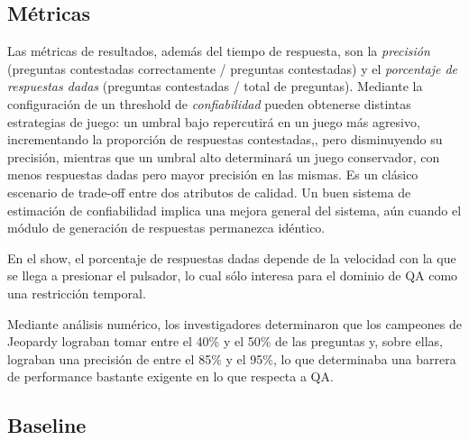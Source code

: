 \subsection{Métricas}

Las métricas de resultados, además del tiempo de respuesta, son la
\textit{precisión} (preguntas contestadas correctamente / preguntas
contestadas) y el \textit{porcentaje de respuestas dadas }(preguntas
contestadas / total de preguntas). Mediante la configuración de un
threshold de \textit{confiabilidad} pueden obtenerse distintas
estrategias de juego: un umbral bajo repercutirá en un juego más
agresivo, incrementando la proporción de respuestas contestadas,,
pero disminuyendo su precisión, mientras que un umbral alto
determinará un juego conservador, con menos respuestas dadas pero
mayor precisión en las mismas. Es un clásico escenario de trade-off
entre dos atributos de calidad. Un buen sistema de estimación de
confiabilidad implica una mejora general del sistema, aún cuando el
módulo de generación de respuestas permanezca idéntico.


\bigskip

En el show, el porcentaje de respuestas dadas depende de la velocidad
con la que se llega a presionar el pulsador, lo cual sólo interesa
para el dominio de QA como una restricción temporal. 


\bigskip

Mediante análisis numérico, los investigadores determinaron que los
campeones de Jeopardy lograban tomar entre el 40\% y el 50\% de las
preguntas y, sobre ellas, lograban una precisión de entre el 85\% y
el 95\%, lo que determinaba una barrera de performance bastante
exigente en lo que respecta a QA.


\bigskip

\subsection{Baseline}

